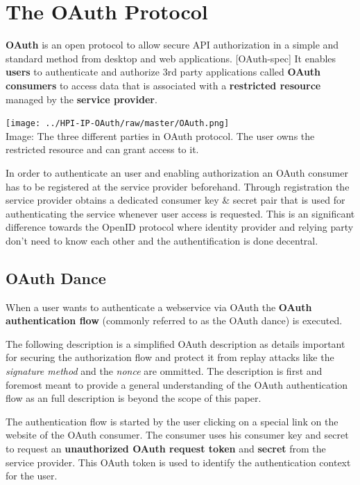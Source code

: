\section{The OAuth Protocol}

\textbf{OAuth} is an open protocol to allow secure API
authorization in a simple and standard method from desktop and web
applications. [OAuth-spec] It enables \textbf{users} to
authenticate and authorize 3rd party applications called
\textbf{OAuth consumers} to access data that is associated with a
\textbf{restricted resource} managed by the
\textbf{service provider}.

\texttt{[image: ../HPI-IP-OAuth/raw/master/OAuth.png]}\\Image: The
three different parties in OAuth protocol. The user owns the
restricted resource and can grant access to it.

In order to authenticate an user and enabling authorization an
OAuth consumer has to be registered at the service provider
beforehand. Through registration the service provider obtains a
dedicated consumer key \& secret pair that is used for
authenticating the service whenever user access is requested. This
is an significant difference towards the OpenID protocol where
identity provider and relying party don't need to know each other
and the authentification is done decentral.

\subsection{OAuth Dance}

When a user wants to authenticate a webservice via OAuth the
\textbf{OAuth authentication flow} (commonly referred to as the
OAuth dance) is executed.

The following description is a simplified OAuth description as
details important for securing the authorization flow and protect
it from replay attacks like the \emph{signature method} and the
\emph{nonce} are ommitted. The description is first and foremost
meant to provide a general understanding of the OAuth
authentication flow as an full description is beyond the scope of
this paper.

The authentication flow is started by the user clicking on a
special link on the website of the OAuth consumer. The consumer
uses his consumer key and secret to request an
\textbf{unauthorized OAuth request token} and \textbf{secret} from
the service provider. This OAuth token is used to identify the
authentication context for the user.

